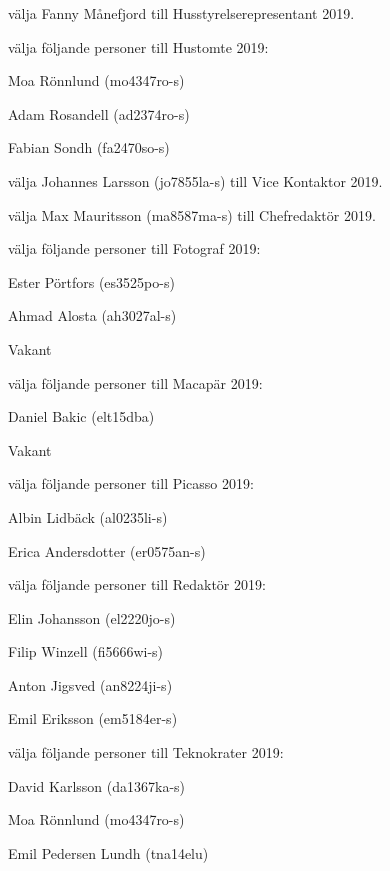\documentclass[10pt]{article}
\begin{document}
\begin{paragrafer}
\begin{paralist}
    \Mba välja Fanny Månefjord till Husstyrelserepresentant 2019.

    \Mba välja följande personer till Hustomte 2019:
    \begin{tightdashlist}
        \item Moa Rönnlund (mo4347ro-s)
        \item Adam Rosandell (ad2374ro-s)
        \item Fabian Sondh (fa2470so-s)
    \end{tightdashlist}

    \Mba välja Johannes Larsson (jo7855la-s) till Vice Kontaktor 2019.

    \Mba välja Max Mauritsson (ma8587ma-s) till Chefredaktör 2019.

    \Mba välja följande personer till Fotograf 2019:
    \begin{tightdashlist}
        \item Ester Pörtfors (es3525po-s)
        \item Ahmad Alosta (ah3027al-s)
        \item Vakant
    \end{tightdashlist}

    \Mba välja följande personer till Macapär 2019:
    \begin{tightdashlist}
        \item Daniel Bakic (elt15dba)
        \item Vakant
    \end{tightdashlist}

    \Mba välja följande personer till Picasso 2019:
    \begin{tightdashlist}
        \item Albin Lidbäck (al0235li-s)
        \item Erica Andersdotter (er0575an-s)
    \end{tightdashlist}

    \Mba välja följande personer till Redaktör 2019:
    \begin{tightdashlist}
        \item Elin Johansson (el2220jo-s)
        \item Filip Winzell (fi5666wi-s)
        \item Anton Jigsved (an8224ji-s)
        \item Emil Eriksson (em5184er-s)
    \end{tightdashlist}

    \Mba välja följande personer till Teknokrater 2019:
    \begin{tightdashlist}
        \item David Karlsson (da1367ka-s)
        \item Moa Rönnlund (mo4347ro-s)
        \item Emil Pedersen Lundh (tna14elu)
    \end{tightdashlist}


\end{paralist}
\end{paragrafer}
\end{document}
